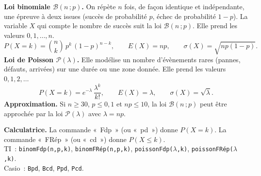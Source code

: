 \documentclass[a4paper,11pt]{article}
\begin{document}
\begin{rappel}
\textbf{Loi binomiale $\mathcal{B}(n\,;p)$.} On répète $n$ fois, de façon identique et indépendante, une épreuve à deux issues (succès de probabilité $p$, échec de probabilité $1-p$). La variable $X$ qui compte le nombre de succès suit la loi $\mathcal{B}(n\,;p)$. Elle prend les valeurs $0, 1, \dots, n$.
\[
P(X = k) = \binom{n}{k}\,p^{k}\,(1-p)^{n-k},\qquad E(X) = np,\qquad \sigma(X) = \sqrt{np(1-p)}.
\]
\textbf{Loi de Poisson $\mathcal{P}(\lambda)$.} Elle modélise un nombre d'évènements rares (pannes, défauts, arrivées) sur une durée ou une zone donnée. Elle prend les valeurs $0, 1, 2, \dots$
\[
P(X = k) = e^{-\lambda}\,\frac{\lambda^{k}}{k!},\qquad E(X) = \lambda,\qquad \sigma(X) = \sqrt{\lambda}.
\]
\textbf{Approximation.} Si $n \geq 30$, $p \leq 0{,}1$ et $np \leq 10$, la loi $\mathcal{B}(n\,;p)$ peut être approchée par la loi $\mathcal{P}(\lambda)$ avec $\lambda = np$.

\smallskip
\textbf{Calculatrice.} La commande «~Fdp~» (ou «~pd~») donne $P(X = k)$. La commande «~FRép~» (ou «~cd~») donne $P(X \leq k)$.\\
{\small TI~: \texttt{binomFdp(n,p,k)}, \texttt{binomFRép(n,p,k)}, \texttt{poissonFdp($\lambda$,k)}, \texttt{poissonFRép($\lambda$,k)}.\\ Casio~: \texttt{Bpd}, \texttt{Bcd}, \texttt{Ppd}, \texttt{Pcd}.}
\end{rappel}

\newpage
\end{document}
